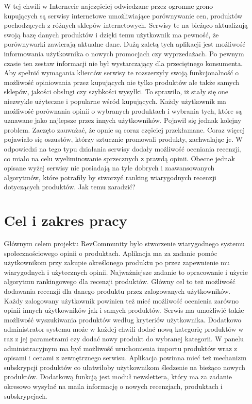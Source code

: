 W tej chwili w Internecie najczęściej odwiedzane przez ogromne grono kupujących są serwisy internetowe umożliwiające porównywanie cen, produktów pochodzących z różnych sklepów internetowych. Serwisy te na bieżąco aktualizują swoją bazę danych produktów i dzięki temu użytkownik ma pewność, że porównywarki zawierają aktualne dane. Dużą zaletą tych aplikacji jest możliwość informowania użytkownika o nowych promocjach czy wyprzedażach. Po pewnym czasie ten zestaw informacji nie był wystarczający dla przeciętnego konsumenta. Aby spełnić wymagania klientów serwisy te rozszerzyły swoją funkcjonalność o możliwość opiniowania przez kupujących nie tylko produktów ale także samych sklepów, jakości obsługi czy szybkości wysyłki. To sprawiło, iż stały się one niezwykle użyteczne i popularne wśród kupujących. Każdy użytkownik ma możliwość porównania opinii o wybranych produktach i wybrania tych, które są uznawane jako najlepsze przez innych użytkowników. Pojawił się jednak kolejny problem. Zaczęto zauważać, że opnie są coraz częściej przekłamane. Coraz więcej pojawiało się oszustów, którzy sztucznie promowali produkty, zachwalając je. W odpowiedzi na tego typu działania serwisy dodały możliwość oceniania recenzji, co miało na celu wyeliminowanie sprzecznych z prawdą opinii. Obecne jednak opisane wyżej serwisy nie posiadają na tyle dobrych i zaawansowanych algorytmów, które potrafiły by stworzyć ranking wiarygodnych recenzji dotyczących produktów. Jak temu zaradzić?  
 


\section{Cel i zakres pracy}
Głównym celem projektu RevCommunity było stworzenie wiarygodnego systemu społecznościowego opinii o produktach. Aplikacja ma za zadanie pomóc użytkownikom przy zakupie określonego produktu po przez zapewnienie mu wiarygodnych i użytecznych opinii. Najważniejsze zadanie to opracowanie i użycie algorytmu rankingowego dla recenzji produktów. Główny cel to też możliwość dodawania recenzji dla danego produktu przez zalogowanych użytkowników. Każdy zalogowany użytkownik powinien też mieć możliwość ocenienia zarówno opinii innych użytkowników jak i samych produktów. Serwis ma umożliwić także możliwość wyszukiwania produktów według kryteriów użytkownika. Dodatkowo administrator systemu może w każdej chwili dodać nową kategorię produktów w raz z jej parametrami czy dodać nowy produkt do wybranej kategorii. W panelu administracyjnym ma być możliwość uruchomienia importu produktów wraz z opisami i cenami z zewnętrznego serwisu. Aplikacja powinna mieć też mechanizm subskrypcji produktów co ułatwiłoby użytkownikom śledzenie na bieżąco nowych produktów. Dodatkową funkcją jest moduł newslettera, który ma za zadanie okresowo wysyłać na maila informację o nowych recenzjach, produktach i subskrypcjach. 

